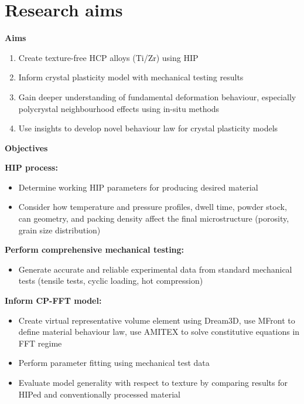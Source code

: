 \chapter{Research aims}

{\LARGE\textbf{Aims}}
\begin{enumerate}
    \item Create texture-free HCP alloys (Ti/Zr) using HIP
    \item Inform crystal plasticity model with mechanical testing results
    \item Gain deeper understanding of fundamental deformation behaviour, especially polycrystal neighbourhood effects using in-situ methods
    \item Use insights to develop novel behaviour law for crystal plasticity models
\end{enumerate}

\vspace{\baselineskip}
{\LARGE\textbf{Objectives}}

\textbf{HIP process:}
\begin{itemize}
    \item Determine working HIP parameters for producing desired material
    \item Consider how temperature and pressure profiles, dwell time, powder stock, can geometry, and packing density affect the final microstructure (porosity, grain size distribution)
\end{itemize}

\textbf{Perform comprehensive mechanical testing:}
\begin{itemize}
    \item Generate accurate and reliable experimental data from standard mechanical tests (tensile tests, cyclic loading, hot compression)
\end{itemize}

\pagebreak
\textbf{Inform CP-FFT model:}
\begin{itemize}
    \item Create virtual representative volume element using Dream3D, use MFront to define material behaviour law, use AMITEX to solve constitutive equations in FFT regime
    \item Perform parameter fitting using mechanical test data
    \item Evaluate model generality with respect to texture by comparing results for HIPed and conventionally processed material
\end{itemize}


